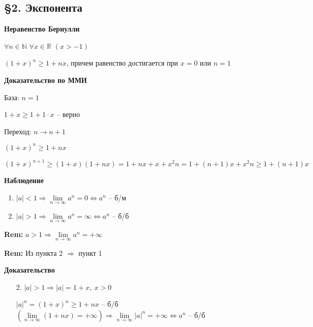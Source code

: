 \documentclass[14pt, letter paper]{article}
\begin{document}
\begin{center}
    \subsection*{\S 2. Экспонента}
\end{center}

\textbf{Неравенство Бернулли}

$\forall n \in \mathds{N}$ $\forall x \in \mathds{R}$ $(x > -1)$

$(1 + x)^n \geq 1 + nx$, причем равенство достигается при $x = 0$ или $n = 1$

\begin{center}
    \textbf{Доказательство по ММИ}
\end{center}

База: $n = 1$

$1 + x \geq 1 + 1 \cdot x$ -- верно

Переход: $n \rightarrow n + 1$

$(1 + x)^n \geq 1 + nx$

$(1 + x)^{n+1} \geq (1+x)(1 + nx) = 1 + nx + x + x^2n = 1 + (n+1)x + x^2n \geq 1 + (n+1)x$

\textbf{Наблюдение}

\begin{enumerate}
    \item $|a| < 1 \Rightarrow \lim\limits_{n \rightarrow \infty}{a^n} = 0 \Leftrightarrow a^n$ -- б/м

    \item $|a| > 1 \Rightarrow \lim\limits_{n \rightarrow \infty}{a^n} = \infty \Leftrightarrow a^n$ -- б/б
\end{enumerate}

\textbf{Rem:} $a > 1 \Rightarrow \lim\limits_{n \rightarrow \infty}{a^n} = + \infty$

\textbf{Rem:} Из пункта 2 $\Rightarrow$ пункт 1

\begin{center}
    \textbf{Доказательство}
\end{center}

\begin{enumerate}
    \item[2.] $|a| > 1 \Rightarrow |a| = 1 + x,\ x > 0$

    $|a|^n = (1 + x)^n \geq 1 + nx$ -- б/б $(\lim\limits_{n \rightarrow \infty}{(1 + nx)} = + \infty) \Rightarrow \lim\limits_{n \rightarrow \infty}{|a|^n} = + \infty \Leftrightarrow a^n$ -- б/б
\end{enumerate}
\end{document}
